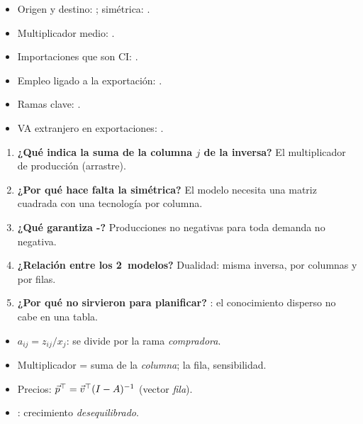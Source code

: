 \documentclass{article}
\begin{document}
\begin{columnas}
\anexorepaso
{}
\begin{itemize}
\item Origen y destino: ; simétrica: .
\item Multiplicador medio: .
\item Importaciones que son CI: .
\item Empleo ligado a la exportación: .
\item Ramas clave: .
\item VA extranjero en exportaciones: .
\end{itemize}
\begin{enumerate}
\item \textbf{¿Qué indica la suma de la columna $j$ de la inversa?} El multiplicador de producción (arrastre).
\item \textbf{¿Por qué hace falta la simétrica?} El modelo necesita una matriz cuadrada con una tecnología por columna.
\item \textbf{¿Qué garantiza -?} Producciones no negativas para toda demanda no negativa.
\item \textbf{¿Relación entre los 2~modelos?} Dualidad: misma inversa, por columnas y por filas.
\item \textbf{¿Por qué no sirvieron para planificar?} : el conocimiento disperso no cabe en una tabla.
\end{enumerate}
\begin{trampa}
\begin{itemize}
\item $a_{ij}=z_{ij}/x_j$: se divide por la rama \emph{compradora}.
\item Multiplicador = suma de la \emph{columna}; la fila, sensibilidad.
\item Precios: $\vec{p}^{\top}=\vec{v}^{\top}(I-A)^{-1}$ (vector \emph{fila}).
\item {}: crecimiento \emph{desequilibrado}.
\end{itemize}
\end{trampa}

\end{columnas}
\end{document}
